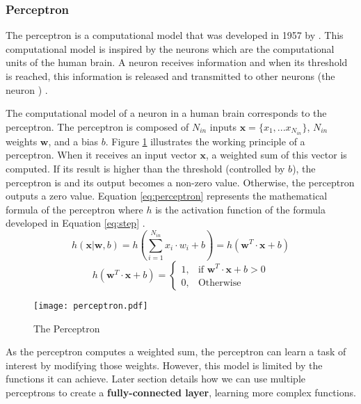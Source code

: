 \subsubsection{Perceptron} \label{subs:perceptron}
The perceptron is a computational model that was developed in 1957 by \textcite{rosenblatt_perceptron_1958}. This computational model is inspired by the neurons which are the computational units of the human brain. A neuron receives information and when its threshold is reached, this information is released and transmitted to other neurons (the neuron ) \cite{rosenblatt_perceptron_1958, matteucci_artificial_2019}.

The computational model of a neuron in a human brain corresponds to the perceptron. The perceptron is composed of $N_{in}$ inputs $\boldsymbol{x} = \{ x_1, ... x_{N_{in}} \}$, $N_{in}$ weights $\boldsymbol{w}$, and a bias $b$. Figure \ref{fig:perceptron} illustrates the working principle of a perceptron. When it receives an input vector $\boldsymbol{x}$, a weighted sum of this vector is computed. If its result is higher than the threshold (controlled by $b$), the perceptron is  and its output becomes a non-zero value. Otherwise, the perceptron outputs a zero value.
Equation \eqref{eq:perceptron} represents the mathematical formula of the perceptron where $h$ is the activation function of the formula developed in Equation \eqref{eq:step} \cite{matteucci_artificial_2019}.
%
\begin{equation}
    h ( \boldsymbol{x} | \boldsymbol{w}, b) = h \left( \sum^{N_{in}}_{i=1} x_i \cdot w_i + b \right) = h \left( \boldsymbol{w}^{T} \cdot \boldsymbol{x} + b \right)
    \label{eq:perceptron}
\end{equation}
%
\begin{equation}
    h ( \boldsymbol{w}^{T} \cdot \boldsymbol{x} + b) = \begin{cases} 1, & \mbox{if } \boldsymbol{w}^{T} \cdot \boldsymbol{x} + b > 0 \\ 0, & \mbox{Otherwise} \end{cases}
    \label{eq:step}
\end{equation}
%
\begin{figure}[H]
    \centering
    \texttt{[image: perceptron.pdf]}
    \caption{The Perceptron}
    \label{fig:perceptron}
\end{figure}
%
As the perceptron computes a weighted sum, the perceptron can learn a task of interest by modifying those weights. However, this model is limited by the functions it can achieve. Later section details how we can use multiple perceptrons to create a \textbf{fully-connected layer}, learning more complex functions.
